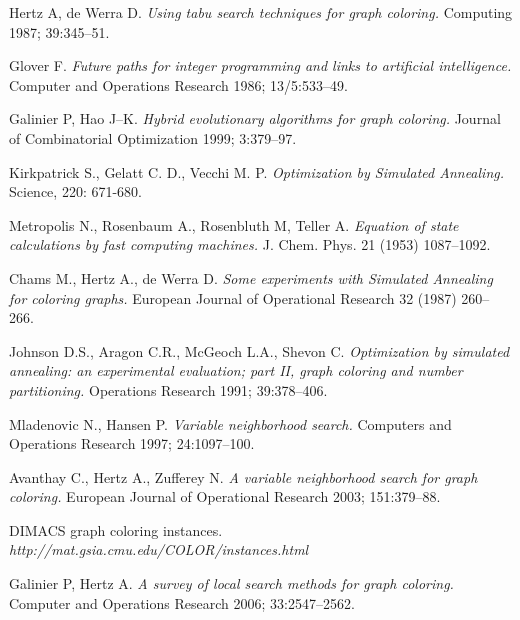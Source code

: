 \documentclass[a4paper,10pt]{article}
\begin{document}
\clearpage
\begin{thebibliography}{}
Hertz A, de Werra D.
\emph{Using tabu search techniques for graph coloring.}
Computing 1987; 39:345--51.

Glover F.
\emph{Future paths for integer programming and links to artificial intelligence.}
Computer and Operations Research 1986; 13/5:533--49.

Galinier P, Hao J--K.
\emph{Hybrid evolutionary algorithms for graph coloring.}
Journal of Combinatorial Optimization 1999; 3:379--97.

Kirkpatrick S., Gelatt C. D., Vecchi M. P.
\emph{Optimization by Simulated Annealing.}
Science, 220: 671-680.

Metropolis N., Rosenbaum A., Rosenbluth M, Teller A.
\emph{Equation of state calculations by fast computing machines.}
J. Chem. Phys. 21 (1953) 1087--1092.

Chams M., Hertz A., de Werra D.
\emph{Some experiments with Simulated Annealing for coloring graphs.}
European Journal of Operational Research 32 (1987) 260--266.

Johnson D.S., Aragon C.R., McGeoch L.A., Shevon C.
\emph{Optimization by simulated annealing: an experimental evaluation; part II, graph coloring and number partitioning.}
Operations Research 1991; 39:378--406.

Mladenovic N., Hansen P.
\emph{Variable neighborhood search.}
Computers and Operations Research 1997; 24:1097--100.

Avanthay C., Hertz A., Zufferey N.
\emph{A variable neighborhood search for graph coloring.}
European Journal of Operational Research 2003; 151:379--88.

DIMACS graph coloring instances. \\
\emph{http://mat.gsia.cmu.edu/COLOR/instances.html}

Galinier P, Hertz A.
\emph{A survey of local search methods for graph coloring.}
Computer and Operations Research 2006; 33:2547--2562.
\end{thebibliography}
\end{document}
